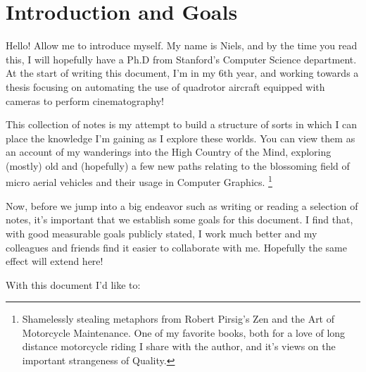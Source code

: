 \chapter{Introduction and Goals} 

Hello! Allow me to introduce myself. My name is Niels, and by the time you read this, I will hopefully have a Ph.D from Stanford's Computer Science department. At the start of writing this document, I'm in my 6th year, and working towards a thesis focusing on automating the use of quadrotor aircraft equipped with cameras to perform cinematography! 

This collection of notes is my attempt to build a structure of sorts in which I can place the knowledge I'm gaining as I explore these worlds. You can view them as an account of my wanderings into the High Country of the Mind\cite{Pirsig2005}, exploring (mostly) old and (hopefully) a few new paths relating to the blossoming field of micro aerial vehicles and their usage in Computer Graphics.  
 \footnote{Shamelessly stealing metaphors from Robert Pirsig's Zen and the Art of Motorcycle Maintenance. One of my favorite books, both for a love of long distance motorcycle riding I share with the author, and it's views on the important strangeness of Quality.}

Now, before we jump into a big endeavor such as writing or reading a selection of notes, it's important that we establish some goals for this document. I find that, with good measurable goals publicly stated, I work much better and my colleagues and friends find it easier to collaborate with me. Hopefully the same effect will extend here!

With this document I'd like to:


